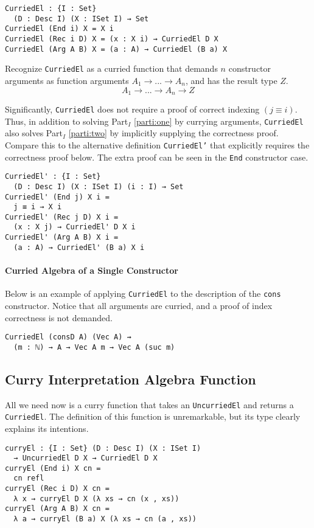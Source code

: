 \documentclass[preprint,nonatbib]{sigplanconf}
\newcommand{\refparti}[1]{Part$_I$ \ref{parti:#1}}
\begin{document}
\begin{verbatim}
CurriedEl : {I : Set}
  (D : Desc I) (X : ISet I) → Set
CurriedEl (End i) X = X i
CurriedEl (Rec i D) X = (x : X i) → CurriedEl D X
CurriedEl (Arg A B) X = (a : A) → CurriedEl (B a) X
\end{verbatim}

Recognize {\tt CurriedEl} as a curried function that demands
$n$ constructor arguments as function arguments
$A_1 → ... → A_n$, and has the result type $Z$.
\[
A_1 → ... → A_n → Z
\]

Significantly, {\tt CurriedEl} does not require a proof of correct
indexing $(j≡i)$. Thus, in addition to solving \refparti{one} by
currying arguments, {\tt CurriedEl} also solves \refparti{two} by
implicitly supplying the correctness proof. Compare this to the
alternative definition {\tt CurriedEl'} that explicitly requires the
correctness proof below. The extra proof can be seen in the
{\tt End} constructor case.

\begin{verbatim}
CurriedEl' : {I : Set}
  (D : Desc I) (X : ISet I) (i : I) → Set
CurriedEl' (End j) X i =
  j ≡ i → X i
CurriedEl' (Rec j D) X i =
  (x : X j) → CurriedEl' D X i
CurriedEl' (Arg A B) X i =
  (a : A) → CurriedEl' (B a) X i
\end{verbatim}

\paragraph{Curried Algebra of a Single Constructor}

Below is an example of applying {\tt CurriedEl} to the
description of the {\tt cons} constructor. Notice that all arguments
are curried, and a proof of index correctness is not demanded.

\begin{verbatim}
CurriedEl (consD A) (Vec A) ⇝
  (m : ℕ) → A → Vec A m → Vec A (suc m)
\end{verbatim}

\subsection{Curry Interpretation Algebra Function}

All we need now is a curry function that takes an
{\tt UncurriedEl} and returns a {\tt CurriedEl}. The definition of
this function is unremarkable, but its type clearly explains its
intentions.

\begin{verbatim}
curryEl : {I : Set} (D : Desc I) (X : ISet I)
  → UncurriedEl D X → CurriedEl D X
curryEl (End i) X cn =
  cn refl
curryEl (Rec i D) X cn =
  λ x → curryEl D X (λ xs → cn (x , xs))
curryEl (Arg A B) X cn =
  λ a → curryEl (B a) X (λ xs → cn (a , xs))
\end{verbatim}
\end{document}
